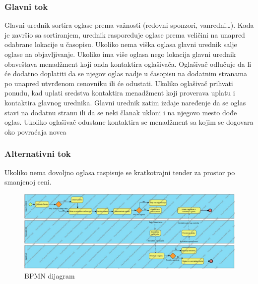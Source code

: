 \subsubsection{Glavni tok}
Glavni urednik sortira oglase prema važnosti (redovni sponzori, vanredni…). Kada je završio sa sortiranjem, urednik raspoređuje oglase prema veličini na unapred odabrane lokacije u časopisu. Ukoliko nema viška oglasa glavni urednik salje oglase na objavljivanje. Ukoliko ima više oglasa nego lokacija glavni urednik obaveštava menadžment koji onda kontaktira oglašivača. Oglašivač odlučuje da li će dodatno doplatiti da se njegov oglas nadje u časopisu na dodatnim stranama po unapred utvrđenom cenovniku ili će odustati. Ukoliko oglašivač prihvati ponudu, kad uplati sredstva kontaktira menadžment koji proverava uplatu i kontaktira glavnog urednika. Glavni urednik zatim izdaje naređenje da se oglas stavi na dodatnu stranu ili da se neki članak ukloni i na njegovo mesto dođe oglas. Ukoliko oglašivač odustane kontaktira se menadžment sa kojim se dogovara oko povraćaja novca
\subsubsection{Alternativni tok}
Ukoliko nema dovoljno oglasa raspisuje se kratkotrajni tender za prostor po smanjenoj ceni.

	
\begin{figure}[h]
    \centering
    \includegraphics[width=1.0\textwidth]{slike/2-bpmn}
    \caption{BPMN dijagram}
    \label{pisanje}
\end{figure}	